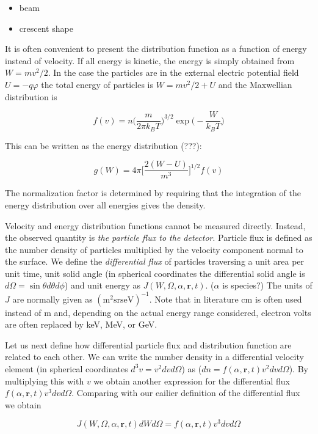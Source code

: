 \documentclass[
  notoc %
]{tufte-book}
\providecommand{\tightlist}{%
  \setlength{\itemsep}{0pt}\setlength{\parskip}{0pt}
}
\begin{document}
\begin{itemize}
\tightlist
\item
  beam
\item
  crescent shape
\end{itemize}

It is often convenient to present the distribution function as a
function of energy instead of velocity. If all energy is kinetic, the
energy is simply obtained from \(W=mv^2/2\). In the case the particles
are in the external electric potential field \(U=-q\varphi\) the total
energy of particles is \(W=mv^2/2+U\) and the Maxwellian distribution is

\[
f(v) = n\Big(\frac{m}{2\pi k_B T}\Big)^{3/2}\exp\Big(-\frac{W}{k_B T}\Big)
\]

This can be written as the energy distribution (???):

\[
g(W) = 4\pi\Big[ \frac{2(W-U)}{m^3} \Big]^{1/2} f(v)
\]

The normalization factor is determined by requiring that the integration
of the energy distribution over all energies gives the density.

Velocity and energy distribution functions cannot be measured directly.
Instead, the observed quantity is \emph{the particle flux to the
detector}. Particle flux is defined as the number density of particles
multiplied by the velocity component normal to the surface. We define
the \emph{differential flux} of particles traversing a unit area per
unit time, unit solid angle (in spherical coordinates the differential
solid angle is \(d\Omega = \sin\theta d\theta d\phi\)) and unit energy
as \(J(W,\Omega, \alpha, \mathbf{r},t)\). (\(\alpha\) is species?) The
units of \(J\) are normally given as
\((\text{m}^2\text{sr}\text{s}\text{eV})^{-1}\). Note that in literature
\(\text{cm}\) is often used instead of \(\text{m}\) and, depending on
the actual energy range considered, electron volts are often replaced by
keV, MeV, or GeV.

Let us next define how differential particle flux and distribution
function are related to each other. We can write the number density in a
differential velocity element (in spherical coordinates
\(d^3v=v^2dvd\Omega\)) as (\(dn=f(\alpha,\mathbf{r},t)v^2dvd\Omega\)).
By multiplying this with \(v\) we obtain another expression for the
differential flux \(f(\alpha,\mathbf{r},t)v^3dvd\Omega\). Comparing with
our eailier definition of the differential flux we obtain

\[
J(W,\Omega, \alpha, \mathbf{r},t)dWd\Omega = f(\alpha,\mathbf{r},t)v^3dvd\Omega
\]
\end{document}
